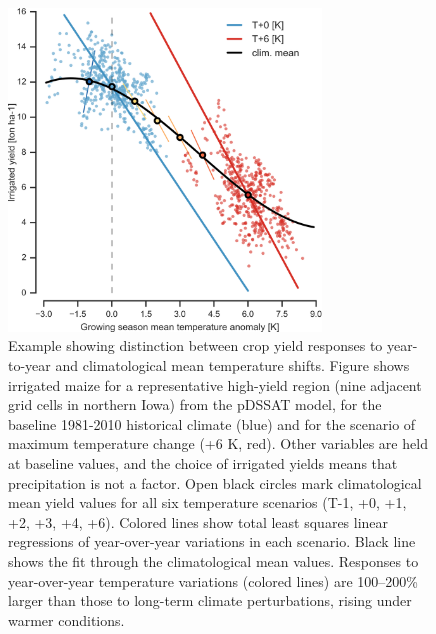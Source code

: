 \documentclass[gmd, manuscript]{copernicus} %
\begin{document}
\begin{figure}[ht]
\centering
   \includegraphics[width=8.3cm]{figures/tempyearvclim.png}
   \caption{Example showing distinction between crop yield responses to year-to-year and climatological mean temperature shifts. 
   Figure shows irrigated maize for a representative high-yield region (nine adjacent grid cells in northern Iowa) from the pDSSAT model, for the baseline 1981-2010 historical climate (blue) and for the scenario of maximum temperature change (+6 K, red). Other variables are held at baseline values, and the choice of irrigated yields means that precipitation is not a factor. 
   Open black circles mark climatological mean yield values for all six temperature scenarios (T-1, +0, +1, +2, +3, +4, +6). Colored lines show total least squares linear regressions of year-over-year variations in each scenario. 
   Black line shows the fit through the climatological mean values.  
   Responses to year-over-year temperature variations (colored lines) are 100--200\% larger than those to long-term climate perturbations, rising under warmer conditions.}
   \label{fig:yearvclim}
\end{figure}
\end{document}
